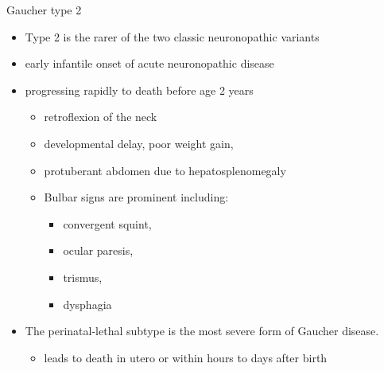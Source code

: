 \documentclass[presentation, smaller]{beamer}
\begin{document}
\begin{frame}[label={sec:orgheadline10}]{Gaucher type 2}
\begin{itemize}
\item Type 2 is the rarer of the two classic neuronopathic variants
\item early infantile onset of acute neuronopathic disease
\item progressing rapidly to death before age 2 years

\begin{itemize}
\item retroflexion of the neck
\item developmental delay, poor weight gain,
\item protuberant abdomen due to hepatosplenomegaly
\item Bulbar signs are prominent including:
\begin{itemize}
\item convergent squint,
\item ocular paresis,
\item trismus,
\item dysphagia
\end{itemize}
\end{itemize}

\item The perinatal-lethal subtype is the most severe form of Gaucher
disease.

\begin{itemize}
\item leads to death in utero or within hours to days after
birth
\end{itemize}
\end{itemize}
\end{frame}
\end{document}
